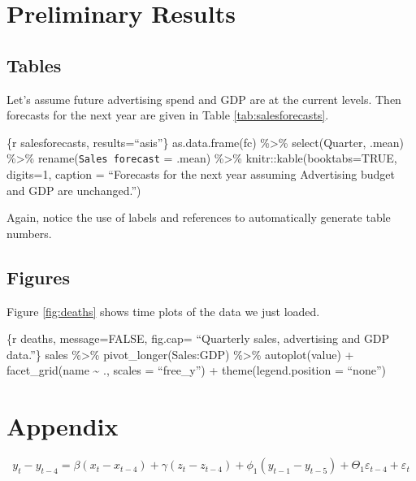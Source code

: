 \documentclass{monashthesis}
\begin{document}
\hypertarget{preliminary-results}{%
\chapter{Preliminary Results}\label{preliminary-results}}

\hypertarget{tables}{%
\section{Tables}\label{tables}}

Let's assume future advertising spend and GDP are at the current levels. Then forecasts for the next year are given in Table \ref{tab:salesforecasts}.

\{r salesforecasts, results=``asis''\}
as.data.frame(fc) \%\textgreater\%
select(Quarter, .mean) \%\textgreater\%
rename(\texttt{Sales\ forecast} = .mean) \%\textgreater\%
knitr::kable(booktabs=TRUE, digits=1,
caption = ``Forecasts for the next year assuming Advertising budget and GDP are unchanged.'')

Again, notice the use of labels and references to automatically generate table numbers.

\hypertarget{figures}{%
\section{Figures}\label{figures}}

Figure \ref{fig:deaths} shows time plots of the data we just loaded.

\{r deaths, message=FALSE, fig.cap= ``Quarterly sales, advertising and GDP data.''\}
sales \%\textgreater\%
pivot\_longer(Sales:GDP) \%\textgreater\%
autoplot(value) +
facet\_grid(name \textasciitilde{} ., scales = ``free\_y'') +
theme(legend.position = ``none'')

\appendix

\hypertarget{appendix}{%
\chapter{Appendix}\label{appendix}}

\begin{equation}
  y_t - y_{t-4} = \beta (x_t-x_{t-4}) + \gamma (z_t-z_{t-4}) + \phi_1 (y_{t-1} - y_{t-5}) + \Theta_1 \varepsilon_{t-4} + \varepsilon_t
\end{equation}

\printbibliography[heading=bibintoc]
\end{document}
